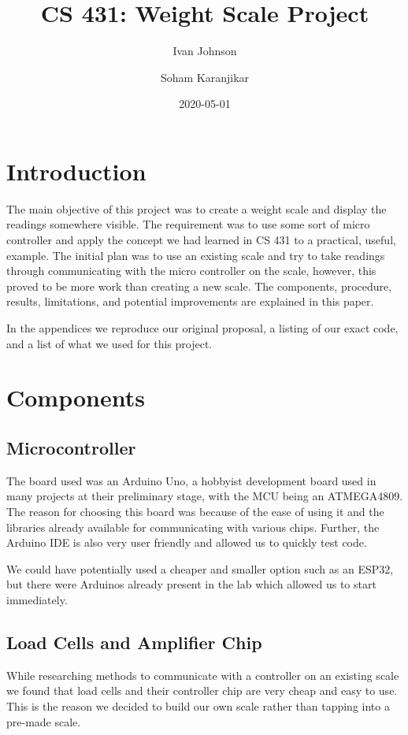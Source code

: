 \documentclass[letterpaper,11pt]{article}
\title{CS 431: Weight Scale Project}
\author{Ivan Johnson \and Soham Karanjikar}
\date{2020-05-01}
\begin{document}
\maketitle

\newpage
\section{Introduction}
The main objective of this project was to create a weight scale and display the
readings somewhere visible. The requirement was to use some sort of micro
controller and apply the concept we had learned in CS 431 to a practical,
useful, example. The initial plan was to use an existing scale and try to take
readings through communicating with the micro controller on the scale, however,
this proved to be more work than creating a new scale. The components,
procedure, results, limitations, and potential improvements are explained in
this paper.

In the appendices we reproduce our original proposal, a listing of our exact
code, and a list of what we used for this project.

\section{Components}
\subsection{Microcontroller}
The board used was an Arduino Uno, a hobbyist development board used in many
projects at their preliminary stage, with the MCU being an ATMEGA4809. The
reason for choosing this board was because of the ease of using it and the
libraries already available for communicating with various chips. Further, the
Arduino IDE is also very user friendly and allowed us to quickly test code.

We could have potentially used a cheaper and smaller option such as an ESP32,
but there were Arduinos already present in the lab which allowed us to start
immediately.

\subsection{Load Cells and Amplifier Chip}
While researching methods to communicate with a controller on an existing scale
we found that load cells and their controller chip are very cheap and easy to
use. This is the reason we decided to build our own scale rather than tapping
into a pre-made scale.
\end{document}
